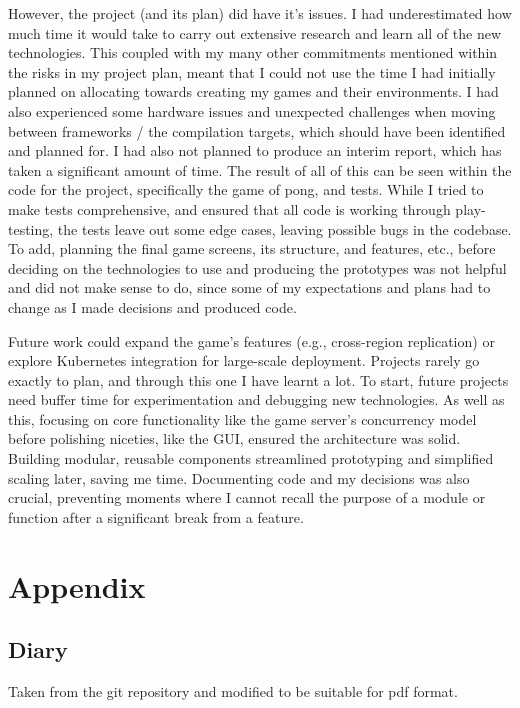 \documentclass[]{final}
\begin{document}
However, the project (and its plan) did have it's issues.
I had underestimated how much time it would
take to carry out extensive research and learn all of the new technologies. This
coupled with my many other commitments mentioned within the risks in my project plan,
meant that I could not use the time I had initially planned on allocating towards
creating my games and their environments. I had also experienced some hardware
issues and unexpected challenges when moving between frameworks / the compilation
targets, which should have been identified and planned for. I had also not planned to
produce an interim report, which has taken a significant amount of time.
The result of all of this can be seen within the
code for the project, specifically the game of pong, and tests. While I tried to make tests comprehensive,
and ensured that all code is working through play-testing, the tests leave out
some edge cases, leaving possible bugs in the codebase.
To add, planning the final game screens, its structure, and features, etc., before
deciding on the technologies to use and producing the prototypes was not helpful and
did not make sense to do, since some of my expectations and plans had to change as I
made decisions and produced code.

Future work could expand the game’s features (e.g., cross-region replication) or
explore Kubernetes integration for large-scale deployment.
Projects rarely go exactly to plan, and through this one I have learnt a lot.
To start, future projects need buffer time for experimentation and debugging new
technologies. As well as this, focusing on core functionality like the game
server’s concurrency model before polishing niceties, like the GUI, ensured the
architecture was solid. Building modular, reusable components streamlined
prototyping and simplified scaling later, saving me time.
Documenting code and my decisions was also crucial, preventing moments
where I cannot recall the purpose of a module or function after a significant
break from a feature.

\newpage
{}


\chapter{Appendix}
\section{Diary}
Taken from the git repository and modified to be suitable for pdf format.
\end{document}
